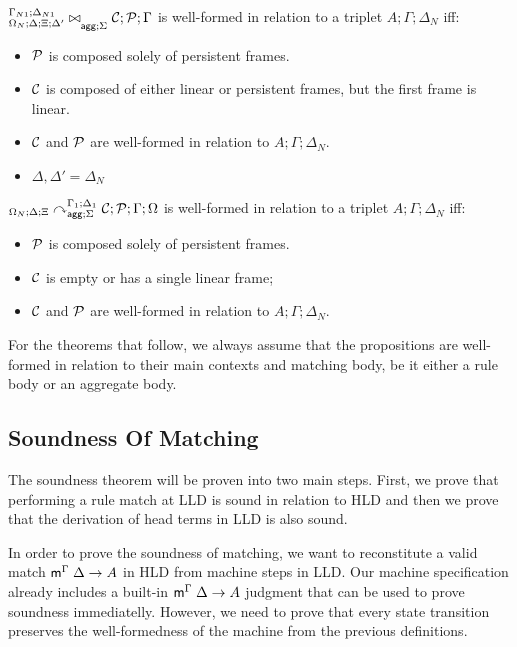 \begin{definition}
${{}^{\Gamma_{N1} ; \Delta_{N1}}_{\Omega_N ; \Delta; \Xi; \Delta'}\bowtie}_{\mathsf{agg} ; \Sigma} \; \mathcal{C}; \mathcal{P} ; \Gamma$ is
well-formed in relation to a triplet $A; \Gamma; \Delta_{N}$ iff:

\begin{itemize}[leftmargin=*]
   \item $\mathcal{P}$ is composed solely of persistent frames.
   \item $\mathcal{C}$ is composed of either linear or persistent frames, but the first
   frame is linear.
   \item $\mathcal{C}$ and $\mathcal{P}$ are well-formed in relation to $A; \Gamma; \Delta_{N}$.
   \item $\Delta, \Delta' = \Delta_{N}$
\end{itemize}
\end{definition}

\begin{definition}
${{}_{\Omega_N ; \Delta ; \Xi}\curvearrowright}_{\mathsf{agg} ; \Sigma}^{\Gamma_1; \Delta_1} \; \mathcal{C};
      \mathcal{P} ; \Gamma ; \Omega$
is well-formed in relation to a triplet $A; \Gamma; \Delta_{N}$ iff:

\begin{itemize}[leftmargin=*]
   \item $\mathcal{P}$ is composed solely of persistent frames.
   \item $\mathcal{C}$ is empty or has a single linear frame;
   \item $\mathcal{C}$ and $\mathcal{P}$ are well-formed in relation to $A; \Gamma; \Delta_{N}$.
\end{itemize}

\end{definition}

For the theorems that follow, we always assume that the propositions are
well-formed in relation to their main contexts and matching body, be it either a
rule body or an aggregate body.

\subsection{Soundness Of Matching}

The soundness theorem will be proven into two main steps. First, we prove that
performing a rule match at LLD is sound in relation to HLD and then we prove
that the derivation of head terms in LLD is also sound.

In order to prove the soundness of matching, we want to reconstitute a valid
match $\mathsf{m}^{\Gamma} \; \Delta \rightarrow A$ in HLD from machine steps in LLD. Our machine
specification already includes a built-in $\mathsf{m}^{\Gamma} \; \Delta \rightarrow A$ judgment that
can be used to prove soundness immediatelly. However, we need to prove that
every state transition preserves the well-formedness of the machine from the
previous definitions.

